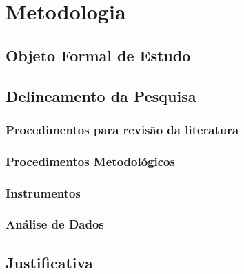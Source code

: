 \chapter{Metodologia}

\section{Objeto Formal de Estudo}
\lipsum[32]

\section{Delineamento da Pesquisa}
\lipsum[33]

\subsection{Procedimentos para revisão da literatura}
\label{procedimentosMetd}
\lipsum[34]

\subsection{Procedimentos Metodológicos}
\lipsum[35]

\subsection{Instrumentos}
\lipsum[36]

\subsection{Análise de Dados}
\lipsum[37]

\section{Justificativa}
\lipsum[38-42]
